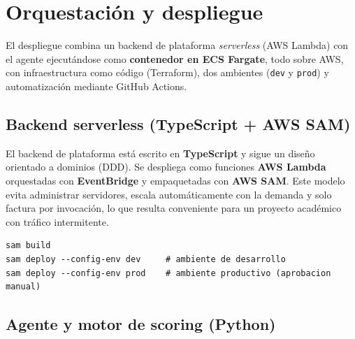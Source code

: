 \section{Orquestaci\'on y despliegue}
\label{sec:orchestration}

El despliegue combina un backend de plataforma \emph{serverless} (AWS Lambda) con
el agente ejecut\'andose como \textbf{contenedor en ECS Fargate}, todo sobre AWS,
con infraestructura como c\'odigo (Terraform), dos ambientes (\texttt{dev} y
\texttt{prod}) y automatizaci\'on mediante GitHub Actions.

\subsection{Backend serverless (TypeScript + AWS SAM)}

El backend de plataforma est\'a escrito en \textbf{TypeScript} y sigue un dise\~no
orientado a dominios (DDD). Se despliega como funciones \textbf{AWS Lambda}
orquestadas con \textbf{EventBridge} y empaquetadas con \textbf{AWS SAM}. Este
modelo evita administrar servidores, escala autom\'aticamente con la demanda y
solo factura por invocaci\'on, lo que resulta conveniente para un proyecto
acad\'emico con tr\'afico intermitente.

\begin{lstlisting}[style=bashstyle, caption={Build y despliegue del backend con AWS SAM}, label={lst:sam-deploy}]
sam build
sam deploy --config-env dev     # ambiente de desarrollo
sam deploy --config-env prod    # ambiente productivo (aprobacion manual)
\end{lstlisting}

\subsection{Agente y motor de scoring (Python)}

